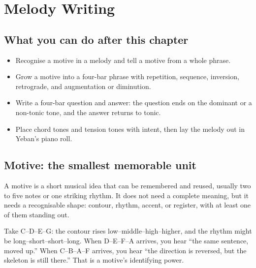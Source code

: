 \clearpage
\chapter{Melody Writing}


\label{sec:melody-writing}

\section*{What you can do after this chapter}
\begin{itemize}
  \item Recognise a motive in a melody and tell a motive from a whole phrase.
  \item Grow a motive into a four-bar phrase with repetition, sequence, inversion, retrograde, and augmentation or diminution.
  \item Write a four-bar question and answer: the question ends on the dominant or a non-tonic tone, and the answer returns to tonic.
  \item Place chord tones and tension tones with intent, then lay the melody out in Yeban's piano roll.
\end{itemize}

\section{Motive: the smallest memorable unit}

A motive is a short musical idea that can be remembered and reused, usually two to five notes or one striking rhythm. It does not need a complete meaning, but it needs a recognisable shape: contour, rhythm, accent, or register, with at least one of them standing out.

Take C--D--E--G: the contour rises low--middle--high--higher, and the rhythm might be long--short--short--long. When D--E--F--A arrives, you hear ``the same sentence, moved up.'' When C--B--A--F arrives, you hear ``the direction is reversed, but the skeleton is still there.'' That is a motive's identifying power.

